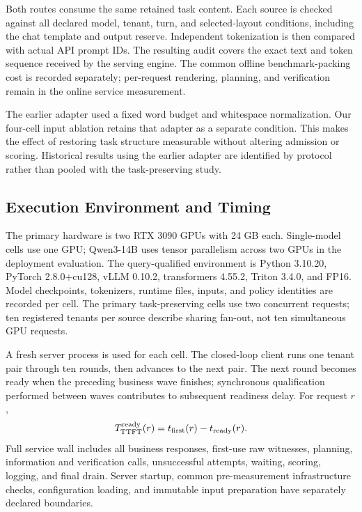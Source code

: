 Both routes consume the same retained task content. Each source is checked against all declared model, tenant, turn, and selected-layout conditions, including the chat template and output reserve. Independent tokenization is then compared with actual API prompt IDs. The resulting audit covers the exact text and token sequence received by the serving engine. The common offline benchmark-packing cost is recorded separately; per-request rendering, planning, and verification remain in the online service measurement.

The earlier adapter used a fixed word budget and whitespace normalization. Our four-cell input ablation retains that adapter as a separate condition. This makes the effect of restoring task structure measurable without altering admission or scoring. Historical results using the earlier adapter are identified by protocol rather than pooled with the task-preserving study.

\subsection{Execution Environment and Timing}
The primary hardware is two RTX 3090 GPUs with 24 GB each. Single-model cells use one GPU; Qwen3-14B uses tensor parallelism across two GPUs in the deployment evaluation. The query-qualified environment is Python 3.10.20, PyTorch 2.8.0+cu128, vLLM 0.10.2, transformers 4.55.2, Triton 3.4.0, and FP16. Model checkpoints, tokenizers, runtime files, inputs, and policy identities are recorded per cell. The primary task-preserving cells use two concurrent requests; ten registered tenants per source describe sharing fan-out, not ten simultaneous GPU requests.

A fresh server process is used for each cell. The closed-loop client runs one tenant pair through ten rounds, then advances to the next pair. The next round becomes ready when the preceding business wave finishes; synchronous qualification performed between waves contributes to subsequent readiness delay. For request $r$,
\begin{equation}
 T^{\rm ready}_{\rm TTFT}(r)=t_{\rm first}(r)-t_{\rm ready}(r).
\end{equation}
Full service wall includes all business responses, first-use raw witnesses, planning, information and verification calls, unsuccessful attempts, waiting, scoring, logging, and final drain. Server startup, common pre-measurement infrastructure checks, configuration loading, and immutable input preparation have separately declared boundaries.

